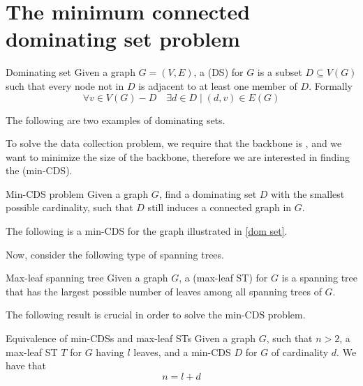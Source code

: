 \documentclass[a4paper, 12pt]{report}
\begin{document}
    \section{The minimum connected dominating set problem}

    \begin{frameddefn}{Dominating set}
        Given a graph $G = (V, E)$, a  (DS) for $G$ is a subset $D \subseteq V(G)$ such that every node not in $D$ is adjacent to at least one member of $D$. Formally $$\forall v \in V(G) - D \quad \exists d \in D \mid (d, v) \in E(G)$$
    \end{frameddefn}

    \begin{example} \label{dom set}
        The following are two examples of dominating sets. 
    \end{example}

    To solve the data collection problem, we require that the backbone is , and we want to minimize the size of the backbone, therefore we are interested in finding the  (min-CDS).

    \begin{frameddefn}{Min-CDS problem}
        Given a graph $G$, find a dominating set $D$ with the smallest possible cardinality, such that $D$ still induces a connected graph in $G$.
    \end{frameddefn}

    \begin{example}
        The following is a min-CDS for the graph illustrated in \cref{dom set}. 
    \end{example}

    Now, consider the following type of spanning trees.

    \begin{frameddefn}{Max-leaf spanning tree}
        Given a graph $G$, a  (max-leaf ST) for $G$ is a spanning tree that has the largest possible number of leaves among all spanning trees of $G$.
    \end{frameddefn}

    The following result is crucial in order to solve the min-CDS problem.

    \begin{framedthm}{Equivalence of min-CDSs and max-leaf STs}
        Given a graph $G$, such that $n > 2$, a max-leaf ST $T$ for $G$ having $l$ leaves, and a min-CDS $D$ for $G$ of cardinality $d$. We have that $$n = l + d$$
    \end{framedthm}
\end{document}
